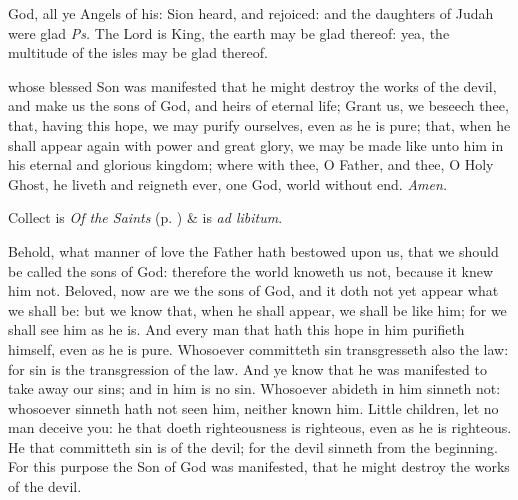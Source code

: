\properantiphonfix

\introit
{} God, all ye Angels of his: Sion heard, and rejoiced: and the daughters of Judah were glad \textit{Ps.} The Lord is King, the earth may be glad thereof: yea, the multitude of the isles may be glad thereof.

\collect
{} whose blessed Son was manifested that he might destroy the works of the devil, and make us the sons of God, and heirs of eternal life; Grant us, we beseech thee, that, having this hope, we may purify ourselves, even as he is pure; that, when he shall appear again with power and great glory, we may be made like unto him in his eternal and glorious kingdom; where with thee, O Father, and thee, O Holy Ghost, he liveth and reigneth ever, one God, world without end. \textit{Amen.}
\begin{rubric}
     Collect is \emph{Of the Saints} (p. \pageref{SPSaints}) \&  is \emph{ad libitum}.
\end{rubric}

 Behold, what manner of love the Father hath bestowed upon us, that we should be called the sons of God: therefore the world knoweth us not, because it knew him not. Beloved, now are we the sons of God, and it doth not yet appear what we shall be: but we know that, when he shall appear, we shall be like him; for we shall see him as he is. And every man that hath this hope in him purifieth himself, even as he is pure. Whosoever committeth sin transgresseth also the law: for sin is the transgression of the law. And ye know that he was manifested to take away our sins; and in him is no sin. Whosoever abideth in him sinneth not: whosoever sinneth hath not seen him, neither known him. Little children, let no man deceive you: he that doeth righteousness is righteous, even as he is righteous. He that committeth sin is of the devil; for the devil sinneth from the beginning. For this purpose the Son of God was manifested, that he might destroy the works of the devil.


